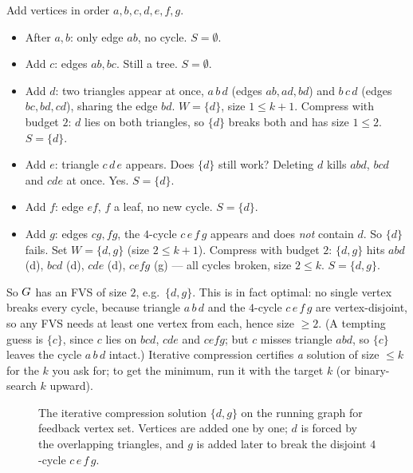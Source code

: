 \begin{labbox}
Add vertices in order $a,b,c,d,e,f,g$.
\begin{itemize}
  \item After $a,b$: only edge $ab$, no cycle. $S=\emptyset$.
  \item Add $c$: edges $ab,bc$. Still a tree. $S=\emptyset$.
  \item Add $d$: two triangles appear at once, $a\,b\,d$ (edges $ab,ad,bd$) and $b\,c\,d$ (edges $bc,bd,cd$), sharing the edge $bd$. $W=\{d\}$, size $1\le k+1$. Compress with budget $2$: $d$ lies on both triangles, so $\{d\}$ breaks both and has size $1\le 2$. $S=\{d\}$.
  \item Add $e$: triangle $c\,d\,e$ appears. Does $\{d\}$ still work? Deleting $d$ kills $abd$, $bcd$ and $cde$ at once. Yes. $S=\{d\}$.
  \item Add $f$: edge $ef$, $f$ a leaf, no new cycle. $S=\{d\}$.
  \item Add $g$: edges $cg,fg$, the $4$-cycle $c\,e\,f\,g$ appears and does \emph{not} contain $d$. So $\{d\}$ fails. Set $W=\{d,g\}$ (size $2\le k+1$). Compress with budget $2$: $\{d,g\}$ hits $abd$ (d), $bcd$ (d), $cde$ (d), $cefg$ (g) --- all cycles broken, size $2\le k$. $S=\{d,g\}$.
\end{itemize}
So $G$ has an FVS of size $2$, e.g.\ $\{d,g\}$. This is in fact optimal: no single vertex breaks every cycle, because triangle $a\,b\,d$ and the $4$-cycle $c\,e\,f\,g$ are vertex-disjoint, so any FVS needs at least one vertex from each, hence size $\ge 2$. (A tempting guess is $\{c\}$, since $c$ lies on $bcd$, $cde$ and $cefg$; but $c$ misses triangle $abd$, so $\{c\}$ leaves the cycle $a\,b\,d$ intact.) Iterative compression certifies \emph{a} solution of size $\le k$ for the $k$ you ask for; to get the minimum, run it with the target $k$ (or binary-search $k$ upward).
\end{labbox}

\begin{figure}[H]
\centering
{}
\caption{The iterative compression solution $\{d,g\}$ on the running graph for feedback vertex set. Vertices are added one by one; $d$ is forced by the overlapping triangles, and $g$ is added later to break the disjoint $4$-cycle $c\,e\,f\,g$.}
\label{ch25:fig-fvs-trace}
\end{figure}



